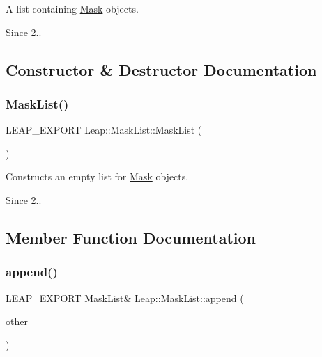 A list containing \hyperlink{class_leap_1_1_mask}{Mask} objects. \begin{DoxySince}{Since}
2.. 
\end{DoxySince}


\subsection{Constructor \& Destructor Documentation}
\mbox{\label{class_leap_1_1_mask_list_ab3bdfdd5be09ded98e9c2f586b77d640}} 
\subsubsection{\texorpdfstring{Mask\+List()}{MaskList()}}
{\footnotesize\ttfamily L\+E\+A\+P\+\_\+\+E\+X\+P\+O\+RT Leap\+::\+Mask\+List\+::\+Mask\+List (\begin{DoxyParamCaption}{ }\end{DoxyParamCaption})}

Constructs an empty list for \hyperlink{class_leap_1_1_mask}{Mask} objects. \begin{DoxySince}{Since}
2.. 
\end{DoxySince}


\subsection{Member Function Documentation}
\mbox{\label{class_leap_1_1_mask_list_acbde19bc85660b467662bcb2796f3a53}} 
\subsubsection{\texorpdfstring{append()}{append()}}
{\footnotesize\ttfamily L\+E\+A\+P\+\_\+\+E\+X\+P\+O\+RT \hyperlink{class_leap_1_1_mask_list}{Mask\+List}\& Leap\+::\+Mask\+List\+::append (\begin{DoxyParamCaption}\item[{const \hyperlink{class_leap_1_1_mask_list}{Mask\+List} \&}]{other }\end{DoxyParamCaption})}

